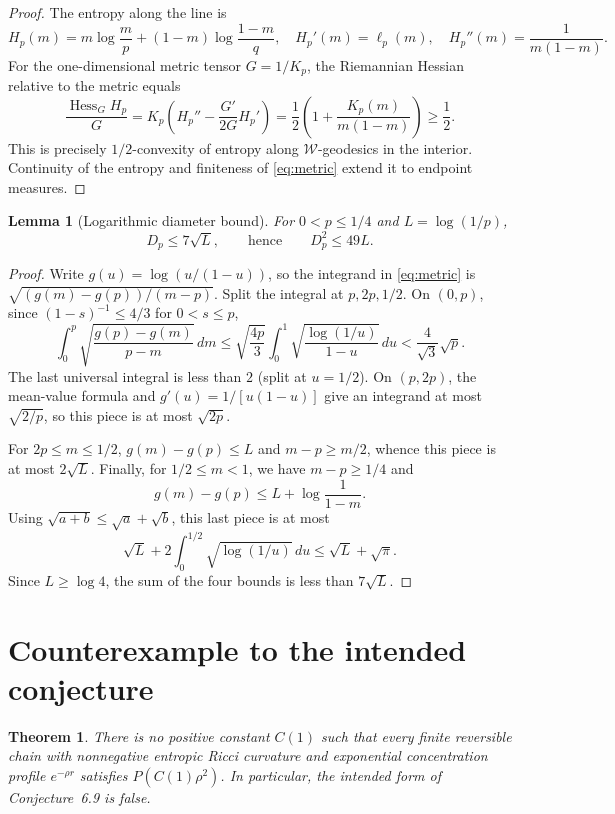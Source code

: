 \documentclass[11pt]{article}
\newtheorem{theorem}{Theorem}
\newtheorem{lemma}{Lemma}
\newcommand{\W}{\mathcal W}
\begin{document}
\begin{proof}
The entropy along the line is
\[
 H_p(m)=m\log\frac mp+(1-m)\log\frac{1-m}{q},
 \quad H_p'(m)=\ell_p(m),\quad
 H_p''(m)=\frac1{m(1-m)}.
\]
For the one-dimensional metric tensor $G=1/K_p$, the Riemannian Hessian
relative to the metric equals
\[
 \frac{\operatorname{Hess}_G H_p}{G}
 =K_p\left(H_p''-\frac{G'}{2G}H_p'\right)
 =\frac12\left(1+\frac{K_p(m)}{m(1-m)}\right)\geq\frac12.
\]
This is precisely $1/2$-convexity of entropy along $\W$-geodesics in the
interior. Continuity of the entropy and finiteness of \eqref{eq:metric}
extend it to endpoint measures.
\end{proof}

\begin{lemma}[Logarithmic diameter bound]\label{lem:D}
For $0<p\leq1/4$ and $L=\log(1/p)$,
\[
                            D_p\leq7\sqrt L,
 \qquad\text{hence}\qquad D_p^2\leq49L.
\]
\end{lemma}

\begin{proof}
Write $g(u)=\log(u/(1-u))$, so the integrand in \eqref{eq:metric} is
$\sqrt{(g(m)-g(p))/(m-p)}$. Split the integral at $p,2p,1/2$.
On $(0,p)$, since $(1-s)^{-1}\leq4/3$ for $0<s\leq p$,
\[
 \int_0^p\sqrt{\frac{g(p)-g(m)}{p-m}}\,dm
 \leq\sqrt{\frac{4p}{3}}
 \int_0^1\sqrt{\frac{\log(1/u)}{1-u}}\,du
 <\frac4{\sqrt3}\sqrt p.
\]
The last universal integral is less than $2$ (split at $u=1/2$).
On $(p,2p)$, the mean-value formula and
$g'(u)=1/[u(1-u)]$ give an integrand at most $\sqrt{2/p}$, so this piece is
at most $\sqrt{2p}$.

For $2p\leq m\leq1/2$,
$g(m)-g(p)\leq L$ and $m-p\geq m/2$, whence this piece is at most
$2\sqrt L$. Finally, for $1/2\leq m<1$, we have $m-p\geq1/4$ and
\[
 g(m)-g(p)\leq L+\log\frac1{1-m}.
\]
Using $\sqrt{a+b}\leq\sqrt a+\sqrt b$, this last piece is at most
\[
 \sqrt L+2\int_0^{1/2}\sqrt{\log(1/u)}\,du
 \leq\sqrt L+\sqrt\pi.
\]
Since $L\geq\log4$, the sum of the four bounds is less than
$7\sqrt L$.
\end{proof}

\section{Counterexample to the intended conjecture}

\begin{theorem}\label{thm:counter}
There is no positive constant $C(1)$ such that every finite reversible chain
with nonnegative entropic Ricci curvature and exponential concentration
profile $e^{-\rho r}$ satisfies $P(C(1)\rho^2)$.
In particular, the intended form of Conjecture~6.9 is false.
\end{theorem}
\end{document}
